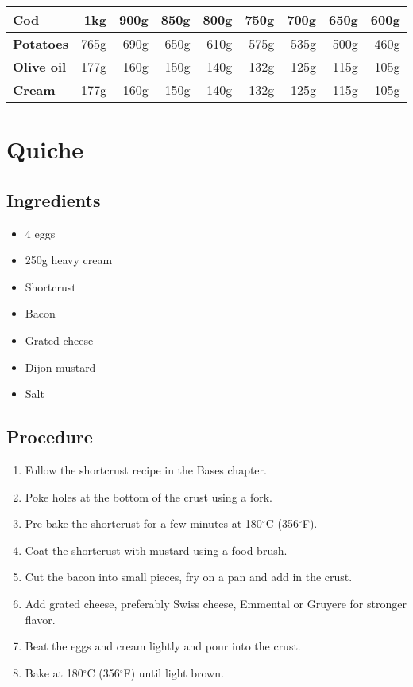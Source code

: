 \documentclass[10pt]{book}
\newcommand{\degree}{$^\circ$}
\begin{document}
	\begin{center}
	\begin{tabular}{l | r | r | r | r | r | r | r | r}
		\textbf{Cod} 		& 1kg 	& 900g & 850g & 800g & 750g & 700g & 650g & 600g\\
		\hline\hline
		\textbf{Potatoes} 	& 765g 	& 690g & 650g & 610g & 575g & 535g & 500g & 460g\\
		\hline
		\textbf{Olive oil} 	& 177g 	& 160g & 150g & 140g & 132g & 125g & 115g & 105g\\
		\hline
		\textbf{Cream}	 	& 177g 	& 160g & 150g & 140g & 132g & 125g & 115g & 105g\\
	\end{tabular}
	\end{center}
	
\newpage


\newpage
\section*{Quiche}
\subsection*{Ingredients}
	\begin{itemize}
		\item 4 eggs
		\item 250g heavy cream
		\item Shortcrust
		\item Bacon
		\item Grated cheese
		\item Dijon mustard
		\item Salt
	\end{itemize}
\subsection*{Procedure}
	\begin{enumerate}
		\item Follow the shortcrust recipe in the Bases chapter.
		\item Poke holes at the bottom of the crust using a fork.
		\item Pre-bake the shortcrust for a few minutes at 180{\degree}C (356{\degree}F).
		\item Coat the shortcrust with mustard using a food brush.
		\item Cut the bacon into small pieces, fry on a pan and add in the crust.
		\item Add grated cheese, preferably Swiss cheese, Emmental or Gruyere for stronger flavor.
		\item Beat the eggs and cream lightly and pour into the crust.
		\item Bake at 180{\degree}C (356{\degree}F) until light brown.
	\end{enumerate}
\newpage
\end{document}
